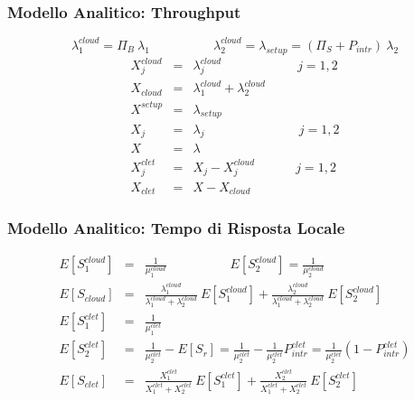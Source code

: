 \begin{frame}
\frametitle{Modello Analitico: Throughput}
\begin{displaymath}
\lambda_1^{cloud} = \Pi_B \ \lambda_1 
\qquad\quad\qquad
\lambda_2^{cloud} = \lambda_{setup} = (\Pi_S + P_{intr}) \ \lambda_2 
\end{displaymath}
%
\setlength\arraycolsep{2pt}
\begin{eqnarray*}
X_j^{cloud} &=& \lambda_j^{cloud}   \qquad\quad\qquad\quad j=1,2 \\
X_{cloud} &=& \lambda_1^{cloud} + \lambda_2^{cloud}   \\
X^{setup} &=& \lambda_{setup}   \\
X_j &=& \lambda_j  \ \quad\qquad\quad\qquad \ \quad j=1,2 \\
X &=& \lambda \\
X_j^{clet} &=& X_j - X_j^{cloud} \ \qquad\quad j=1,2 \\
X_{clet} &=& X - X_{cloud} 
\end{eqnarray*}
\end{frame}
\begin{frame}
\frametitle{Modello Analitico: Tempo di Risposta Locale}

\setlength\arraycolsep{2pt}
\begin{eqnarray*}
E[S_1^{cloud}] &=& \frac{1}{\mu_1^{cloud}} \qquad\quad\qquad
E[S_2^{cloud}] = \frac{1}{\mu_2^{cloud}} \\[10pt]
E[S_{cloud}] &=& 
\frac{\lambda_1^{cloud}}{\lambda_1^{cloud}+\lambda_2^{cloud}} \ E[S_1^{cloud}] +
\frac{\lambda_2^{cloud}}{\lambda_1^{cloud}+\lambda_2^{cloud}} \ E[S_2^{cloud}]
\\[10pt]
E[S_1^{clet}] &=& \frac{1}{\mu_1^{clet}} \\[10pt]
E[S_2^{clet}] &=& \frac{1}{\mu_2^{clet}} - E[S_r] = 
\frac{1}{\mu_2^{clet}} - \frac{1}{\mu_2^{clet}} P_{intr}^{clet} =
\frac{1}{\mu_2^{clet}} (1 - P_{intr}^{clet}) \\[10pt]
E[S_{clet}] &=& 
\frac{X_1^{clet}}{X_1^{clet}+X_2^{clet}} \ E[S_1^{clet}] +
\frac{X_2^{clet}}{X_1^{clet}+X_2^{clet}} \ E[S_2^{clet}] 
\end{eqnarray*}

\end{frame}

